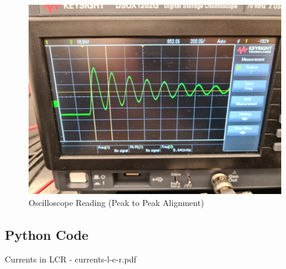 \documentclass[a4paper,12pt]{article}
\begin{document}
\begin{figure}[H]
  \centering
  \includegraphics[width=0.9\linewidth]{../data/20211116_110834.jpg}
  \begin{center}
    \begin{center}   
    \end{center}  \end{center}
  \caption{Oscilloscope Reading (Peak to Peak Alignment)}
  \label{osc}
\end{figure}

\pagebreak

\subsection{Python Code}


\pagebreak

\begin{thebibliography}{99}

 Currents in LCR - currents-l-c-r.pdf

\end{thebibliography}
\end{document}
